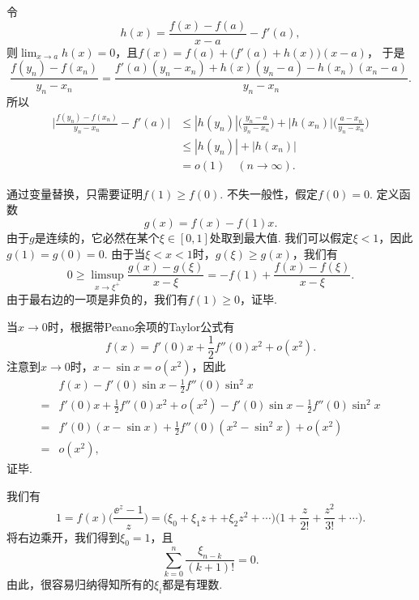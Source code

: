 \begin{ans}
  令
  \[
    h(x)=\frac{f(x)-f(a)}{x-a} - f'(a),
  \]
  则$\lim_{x\to a}h(x)=0$，且$f(x)=f(a)+\big(f'(a)+h(x)\big)
  (x-a)$， 于是
  \[
    \frac{f(y_n)-f(x_n)}{y_n-x_n} =
    \frac{f'(a)(y_n-x_n)+h(x)(y_n-a)-h(x_n)(x_n-a)}{y_n-x_n}.
  \]
  所以
  \begin{align*}
    \bigg| \frac{f(y_n)-f(x_n)}{y_n-x_n} - f'(a) \bigg|
    & \le |h(y_n)|\Big( \frac{y_n-a}{y_n-x_n} \Big)
    +|h(x_n)|\Big( \frac{a-x_n}{y_n-x_n} \Big) \\
    & \le |h(y_n)| + |h(x_n)|\\
    & =o(1)\quad (n\to\infty).
  \end{align*}
\end{ans}

\begin{ans}
  通过变量替换，只需要证明$f(1)\ge f(0)$. 不失一般性，假定$f(0)=0$. 定义函数
  \[ g(x) = f(x) - f(1)x. \]
  由于$g$是连续的，它必然在某个$\xi\in[0,1]$处取到最大值. 我们可以假定$\xi<1$，因此$g(1)=g(0)=0$. 由于当$\xi<x<1$时，$g(\xi)\ge g(x)$，我们有
  \[
    0\ge \limsup_{x\to\xi^+}\frac{g(x)-g(\xi)}{x-\xi}
    = -f(1)+\frac{f(x)-f(\xi)}{x-\xi}.
  \]
  由于最右边的一项是非负的，我们有$f(1)\ge0$，证毕.
\end{ans}

\begin{ans}
  当$x\to0$时，根据带Peano余项的Taylor公式有
  \[
    f(x) = f'(0)x + \frac12f''(0)x^2 + o(x^2).
  \]
  注意到$x\to0$时，$x-\sin x=o(x^2)$，因此
  \begin{align*}
    & f(x)-f'(0)\sin x-\frac12f''(0)\sin^2x\\
    ={}& f'(0)x + \frac12f''(0)x^2 + o(x^2) -f'(0)\sin x-\frac12f''(0)\sin^2x\\
    ={}& f'(0)(x-\sin x)+\frac12f''(0)(x^2-\sin^2x)+o(x^2)\\
    ={}& o(x^2),
  \end{align*}
  证毕.
\end{ans}

\begin{ans}
  我们有
  \[
    1=f(x)\Big(\frac{\ee^z-1}z\Big) =
    \big( \xi_0+\xi_1z++\xi_2z^2+\cdots \big)
    \Big( 1+\frac z{2!}+\frac{z^2}{3!}+\cdots \Big).
  \]
  将右边乘开，我们得到$\xi_0=1$，且
  \[ \sum_{k=0}^n\frac{\xi_{n-k}}{(k+1)!} = 0. \]
  由此，很容易归纳得知所有的$\xi_i$都是有理数.
\end{ans}

